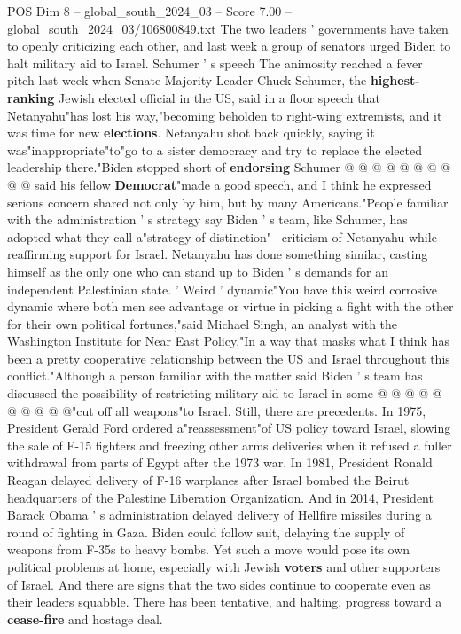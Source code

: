 \begin{textsample}{POS Dim 8 – global\_south\_2024\_03 – Score 7.00 – global\_south\_2024\_03/106800849.txt}
The two leaders ' governments have taken to openly criticizing each other, and last week a group of senators urged Biden to halt military aid to Israel.
Schumer ' s speech The animosity reached a fever pitch last week when Senate Majority Leader Chuck Schumer, the \textbf{highest-ranking} Jewish elected official in the US, said in a floor speech that Netanyahu"has lost his way,"becoming beholden to right-wing extremists, and it was time for new \textbf{elections}.
Netanyahu shot back quickly, saying it was"inappropriate"to"go to a sister democracy and try to replace the elected leadership there."Biden stopped short of \textbf{endorsing} Schumer @ @ @ @ @ @ @ @ @ @ said his fellow \textbf{Democrat}"made a good speech, and I think he expressed serious concern shared not only by him, but by many Americans."People familiar with the administration ' s strategy say Biden ' s team, like Schumer, has adopted what they call a"strategy of distinction"-- criticism of Netanyahu while reaffirming support for Israel.
Netanyahu has done something similar, casting himself as the only one who can stand up to Biden ' s demands for an independent Palestinian state. ' Weird ' dynamic"You have this weird corrosive dynamic where both men see advantage or virtue in picking a fight with the other for their own political fortunes,"said Michael Singh, an analyst with the Washington Institute for Near East Policy."In a way that masks what I think has been a pretty cooperative relationship between the US and Israel throughout this conflict."Although a person familiar with the matter said Biden ' s team has discussed the possibility of restricting military aid to Israel in some @ @ @ @ @ @ @ @ @ @"cut off all weapons"to Israel.
Still, there are precedents.
In 1975, President Gerald Ford ordered a"reassessment"of US policy toward Israel, slowing the sale of F-15 fighters and freezing other arms deliveries when it refused a fuller withdrawal from parts of Egypt after the 1973 war.
In 1981, President Ronald Reagan delayed delivery of F-16 warplanes after Israel bombed the Beirut headquarters of the Palestine Liberation Organization.
And in 2014, President Barack Obama ' s administration delayed delivery of Hellfire missiles during a round of fighting in Gaza.
Biden could follow suit, delaying the supply of weapons from F-35s to heavy bombs.
Yet such a move would pose its own political problems at home, especially with Jewish \textbf{voters} and other supporters of Israel.
And there are signs that the two sides continue to cooperate even as their leaders squabble.
There has been tentative, and halting, progress toward a \textbf{cease-fire} and hostage deal.

\end{textsample}
